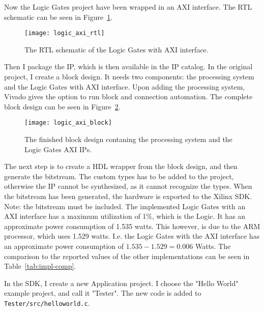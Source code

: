 Now the Logic Gates project have been wrapped in an AXI interface. The RTL
schematic can be seen in Figure~\ref{fig:logic-axi-rtl}.
\begin{figure}
    \texttt{[image: logic\_axi\_rtl]}
    \caption{The RTL schematic of the Logic Gates with AXI interface.}
    \label{fig:logic-axi-rtl}
\end{figure}
Then I package the IP, which is then available in the IP
catalog. In the original project, I create a block design. It needs
two components: the processing system and the Logic Gates with AXI interface. Upon
adding the processing system, Vivado gives the option to run block and
connection automation. The complete block design can be seen in
Figure~\ref{fig:logic-axi-block}.
\begin{figure}
    \texttt{[image: logic\_axi\_block]}
    \caption{The finished block design contaning the processing system and the
    Logic Gates AXI IPs.}
    \label{fig:logic-axi-block}
\end{figure}
The next step is to create a HDL wrapper from the block design, and then
generate the bitstream. The custom types has to be added to the project,
otherwise the IP cannot be synthesized, as it cannot recognize the types. When
the bitstream has been generated, the hardware is exported to the Xilinx SDK.
Note: the bitstream must be included. The implemented Logic Gates with an AXI
interface has a maximum  utilization of 1\%, which is the Logic. It has an
approximate power consumption of 1.535 watts. This however, is due to the ARM
processor, which uses 1.529 watts. I.e. the Logic Gates with the AXI interface
has an approximate power consumption of $1.535-1.529=0.006$ Watts. The
comparison to the reported values of the other implementations can be seen in
Table~\ref{tab:impl-comp}.

In the SDK, I create a new Application project. I choose the
"Hello World" example project, and call it "Tester". The new code is added to
\texttt{Tester/src/helloworld.c}.

